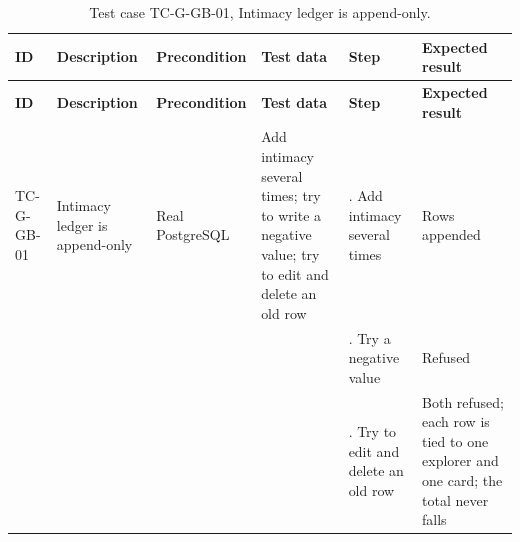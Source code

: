 {\footnotesize{}\renewcommand{\arraystretch}{1.1}
\begin{longtable}{|>{\raggedright\arraybackslash}p{}|>{\raggedright\arraybackslash}p{}|>{\raggedright\arraybackslash}p{}|>{\raggedright\arraybackslash}p{}|>{\raggedright\arraybackslash}p{}|>{\raggedright\arraybackslash}p{}|}
\caption{Test case TC-G-GB-01, Intimacy ledger is append-\allowbreak{}only.} \\
\hline
\textbf{ID} & \textbf{Description} & \textbf{Precondition} & \textbf{Test data} & \textbf{Step} & \textbf{Expected result} \\ \hline
\endfirsthead
\hline
\textbf{ID} & \textbf{Description} & \textbf{Precondition} & \textbf{Test data} & \textbf{Step} & \textbf{Expected result} \\ \hline
\endhead
TC-G-GB-01 & Intimacy ledger is append-only & Real PostgreSQL & Add intimacy several times; try to write a negative value; try to edit and delete an old row & 1. Add intimacy several times & Rows appended \\ \cline{5-6}
 &  &  &  & 2. Try a negative value & Refused \\ \cline{5-6}
 &  &  &  & 3. Try to edit and delete an old row & Both refused; each row is tied to one explorer and one card; the total never falls \\ \hline
\end{longtable}
}


